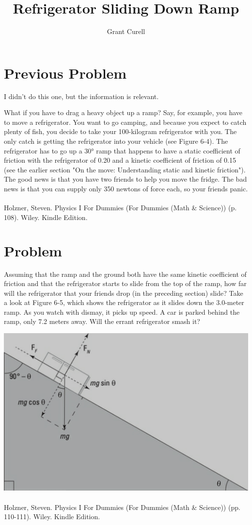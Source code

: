 \documentclass{article}
\title{Refrigerator Sliding Down Ramp}
\author{Grant Curell}
\begin{document}
\maketitle{}
\section{Previous Problem}
I didn't do this one, but the information is relevant.

What if you have to drag a heavy object up a ramp? Say, for example, you have to move a refrigerator. You want to go camping, and because you expect to catch plenty of fish, you decide to take your 100-kilogram refrigerator with you. The only catch is getting the refrigerator into your vehicle (see Figure 6-4). The refrigerator has to go up a \ang{30} ramp that happens to have a static coefficient of friction with the refrigerator of 0.20 and a kinetic coefficient of friction of 0.15 (see the earlier section "On the move: Understanding static and kinetic friction"). The good news is that you have two friends to help you move the fridge. The bad news is that you can supply only 350 newtons of force each, so your friends panic.
\\\\
Holzner, Steven. Physics I For Dummies (For Dummies (Math \& Science)) (p. 108). Wiley. Kindle Edition.

\section{Problem}
Assuming that the ramp and the ground both have the same kinetic coefficient of friction and that the refrigerator starts to slide from the top of the ramp, how far will the refrigerator that your friends drop (in the preceding section) slide? Take a look at Figure 6-5, which shows the refrigerator as it slides down the 3.0-meter ramp. As you watch with dismay, it picks up speed. A car is parked behind the ramp, only 7.2 meters away. Will the errant refrigerator smash it?

\includegraphics[width=\columnwidth]{image}
\\\\
Holzner, Steven. Physics I For Dummies (For Dummies (Math \& Science)) (pp. 110-111). Wiley. Kindle Edition.
\\\\
\end{document}

